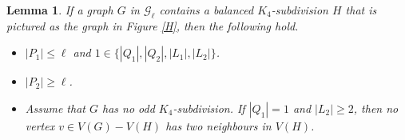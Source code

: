 \documentclass[11pt]{article}
\newtheorem{lemma}[theorem]{Lemma}
\begin{document}
\begin{lemma}\label{odd k4}
If a graph $G$ in $\mathcal{G}_{\ell}$ contains a balanced $K_4$-subdivision $H$ that is pictured as the graph in Figure \ref{H}, then the following hold.
\begin{itemize}
 \item[(1)] $|P_1|\leq\ell$ and $1\in \{|Q_1|, |Q_2|, |L_1|, |L_2|\}$.
\item[(2)] $|P_2|\geq\ell$. %
\item[(3)] Assume that $G$ has no odd $K_4$-subdivision. If $|Q_1|=1$ and $|L_2|\geq2$, then no vertex $v\in V(G)-V(H)$ has two neighbours in $V(H)$. %
\end{itemize}
\end{lemma}
\end{document}
